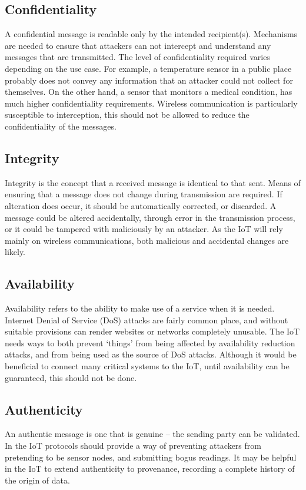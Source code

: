 \documentclass[10pt,journal,compsoc]{IEEEtran}
\begin{document}
\subsection{Confidentiality}
A confidential message is readable only by the intended recipient(s).
Mechanisms are needed to ensure that attackers can not intercept and understand
any messages that are transmitted. The level of confidentiality required varies
depending on the use case. For example, a temperature sensor in a public place
probably does not convey any information that an attacker could not collect for
themselves. On the other hand, a sensor that monitors a medical condition, has
much higher confidentiality requirements. Wireless communication is
particularly susceptible to interception, this should not be allowed to reduce
the confidentiality of the messages.  

\subsection{Integrity}
Integrity is the concept that a received message is identical to that sent.
Means of ensuring that a message does not change during transmission are
required. If alteration does occur, it should be automatically corrected, or
discarded. A message could be altered accidentally, through error in the
transmission process, or it could be tampered with maliciously by an attacker.
As the IoT will rely mainly on wireless communications, both malicious and
accidental changes are likely. 

\subsection{Availability}
Availability refers to the ability to make use of a service when it is needed.
Internet Denial of Service (DoS) attacks are fairly common place, and without
suitable provisions can render websites or networks completely unusable. The
IoT needs ways to both prevent `things' from being affected by availability
reduction attacks, and from being used as the source of DoS attacks. Although
it would be beneficial to connect many critical systems to the IoT, until
availability can be guaranteed, this should not be done.

\subsection{Authenticity}
An authentic message is one that is genuine -- the sending party can be
validated. In the IoT protocols should provide a way of preventing attackers
from pretending to be sensor nodes, and submitting bogus readings. It may be
helpful in the IoT to extend authenticity to provenance, recording a complete
history of the origin of data.  
\end{document}
